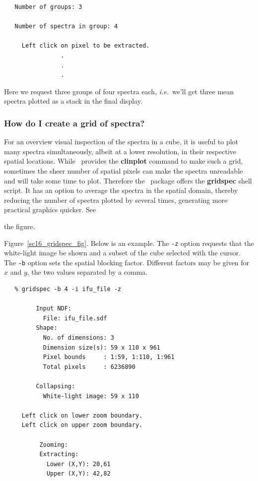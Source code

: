 \documentclass[twoside,11pt]{article}
\newcommand{\latex}[1]{#1}
\newcommand{\xref}[3]{#1}
\newcommand{\xlabel}[1]{}
\begin{document}
{\begin{verbatim}
   Number of groups: 3
 
   Number of spectra in group: 4
  
     Left click on pixel to be extracted.
                .
                .
                .	     
\end{verbatim}\normalsize

Here we request three groups of four spectra each, \emph{i.e.}\ we'll
get three mean spectra plotted as a stack in the final display.

\subsubsection{\label{sc16_gridmap}How do I create a grid of
spectra?\xlabel{sc16_gridmap}}

For an overview visual inspection of the spectra in a cube, it is useful
to plot many spectra simultaneously, albeit at a lower resolution, in
their respective spatial locations.  While \KAPPA\ provides the
\xref{{\bf clinplot}}{sun95}{CLINPLOT} command to make such a grid, sometimes
the sheer number of spatial pixels can make the spectra unreadable and
will take some time to plot.  Therefore the \DATACUBE\ package
offers the \xref{{\bf gridspec}}{sun237}{gridspec} shell script.  It
has an option to average the spectra in the spatial domain, thereby
reducing the number of spectra plotted by several times, generating
more practical graphics quicker.   See
\begin{htmlonly}
the figure.
\end{htmlonly}
\latex{Figure~\ref{sc16_gridspec_fig}.}  Below is an
example.  The {\tt -z} option requests that the white-light image be
shown and a subset of the cube selected with the cursor. The {\tt -b}
option sets the spatial blocking factor.  Different factors may be
given for $x$ and $y$, the two values separated by a comma.

\small\begin{verbatim}
   % gridspec -b 4 -i ifu_file -z

         Input NDF:
           File: ifu_file.sdf
         Shape:
           No. of dimensions: 3
           Dimension size(s): 59 x 110 x 961
           Pixel bounds     : 1:59, 1:110, 1:961
           Total pixels     : 6236890

         Collapsing:
           White-light image: 59 x 110

     Left click on lower zoom boundary.
     Left click on upper zoom boundary.

          Zooming:
          Extracting:
            Lower (X,Y): 20,61
            Upper (X,Y): 42,82


\end{verbatim}}
\end{document}
